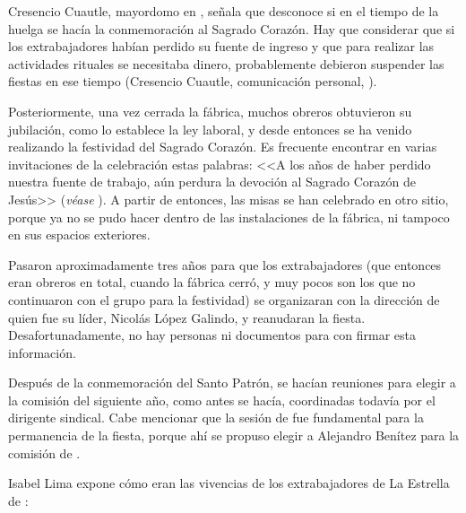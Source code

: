 \documentclass[14pt,letterpaper,twoside]{extbook} %
\begin{document}
\noindent Cresencio Cuautle, mayordomo en , señala que desconoce si en el tiempo de la huelga se hacía la conmemoración al Sagrado Corazón. Hay que considerar que si los extrabajadores habían perdido su fuente de ingreso y que para realizar las actividades rituales se necesitaba dinero, probablemente debieron suspender las fiestas en ese tiempo (Cresencio Cuautle, comunicación personal, ).

Posteriormente, una vez cerrada la fábrica, muchos obreros obtuvieron su jubilación, como lo establece la ley laboral, y desde entonces se ha venido realizando la festividad del Sagrado Corazón. Es frecuente encontrar en varias invitaciones de la celebración estas palabras: <<A los  años de haber perdido nuestra fuente de trabajo, aún perdura la devoción al Sagrado Corazón de Jesús>> (\emph{véase} ). A partir de entonces, las misas se han celebrado en otro sitio, porque ya no se pudo hacer dentro de las instalaciones de la fábrica, ni tampoco en sus espacios exteriores.

Pasaron aproximadamente tres años para que los extrabajadores (que entonces eran  obreros en total, cuando la fábrica cerró, y muy pocos son los que no continuaron con el grupo para la festividad) se organizaran con la dirección de quien fue su líder, Nicolás López Galindo, y reanudaran la fiesta. Desafortunadamente, no hay personas ni documentos para con firmar esta información.

Después de la conmemoración del Santo Patrón, se hacían reuniones para elegir a la comisión del siguiente año, como antes se hacía, coordinadas todavía por el dirigente sindical. Cabe mencionar que la sesión de  fue fundamental para la permanencia de la fiesta, porque ahí se propuso elegir a Alejandro Benítez para la comisión de .

Isabel Lima expone cómo eran las vivencias de los extrabajadores de La Estrella de :
\end{document}
